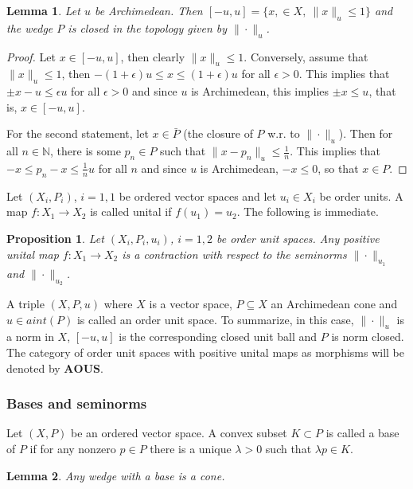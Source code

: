 \documentclass[12pt]{article}
\newtheorem{lemma}{Lemma}
\newtheorem{prop}{Proposition}
\theoremstyle{remark}
\newcommand{\<}{\langle}
\newcommand{\ct}[1]{\mathbf{#1}}
\begin{document}
\begin{lemma}\label{lemma:archimedean} Let $u$ be Archimedean. Then $[-u,u]=\{x,\in X,\ \|x\|_u\le 1\}$ and the wedge $P$ is closed in the topology given by $\|\cdot\|_u$.

\end{lemma}

\begin{proof} Let $x\in [-u,u]$, then clearly $\|x\|_u\le 1$. Conversely, assume that $\|x\|_u\le 1$, then $-(1+\epsilon) u\le x\le (1+\epsilon) u$ for all $\epsilon>0$. 
This implies that $\pm x-u\le \epsilon u$ for all $\epsilon>0$ and since $u$ is Archimedean, this implies $\pm x\le u$, that is, $x\in [-u,u]$.

For the second statement, let $x\in \bar P$ (the closure of $P$ w.r. to $\|\cdot\|_u$). Then for all $n\in \mathbb N$, there is some $p_n\in P$ such that $\|x-p_n\|_u\le \tfrac1n$. This implies that $-x\le p_n-x\le \tfrac 1n u$ for all $n$ and since  $u$ is Archimedean, $-x\le 0$, so that $x\in P$.

\end{proof}

Let $(X_i,P_i)$, $i=1,1$ be ordered vector spaces and let $u_i\in X_i$ be order units. A map $f:X_1\to X_2$ is called unital if $f(u_1)=u_2$. The following is immediate.

\begin{prop} Let $(X_i,P_i,u_i)$, $i=1,2$ be order unit spaces. Any positive unital map $f:X_1\to X_2$ is a contraction with respect to the seminorms $\|\cdot\|_{u_1}$ and 
$\|\cdot\|_{u_2}$.
\end{prop}

A triple $(X,P,u)$ where $X$ is a vector space, $P\subseteq X$ an Archimedean  cone and $u\in aint(P)$ is called an order unit space. To summarize, in this case, 
$\|\cdot\|_u$ is a norm in $X$, $[-u,u]$ is the corresponding closed unit ball and $P$ is norm closed. The category of order unit spaces with positive unital maps as morphisms will be denoted by $\ct{AOUS}$.


\subsubsection*{Bases and seminorms}

Let $(X,P)$ be an ordered vector space. A convex subset $K\subset P$ is called a base of $P$ if for any nonzero $p\in P$ there is a unique $\lambda>0$  such that 
$\lambda p\in K$.  

\begin{lemma} Any wedge with a base is a cone.

\end{lemma}
\end{document}
